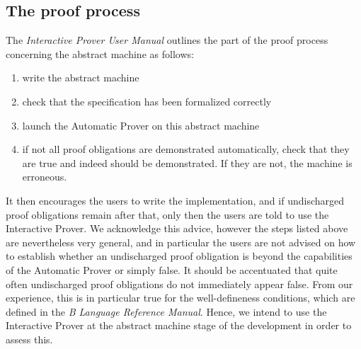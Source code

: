 \documentclass[11pt,journal]{IEEEtran}
\begin{document}
	\subsection{The proof process}
	The \emph{Interactive Prover User Manual}\cite{Prover guide} outlines the part of the proof process concerning the abstract machine as follows:
	\begin{enumerate}
		\item write the abstract machine
		\item check that the specification has been formalized correctly
		\item launch the Automatic Prover on this abstract machine
		\item if not all proof obligations are demonstrated automatically, check that they are true and indeed should be demonstrated. If they are not, the machine is erroneous.
	\end{enumerate}

	It then encourages the users to write the implementation, and if undischarged proof obligations remain after that, only then the users are told to use the Interactive Prover. We acknowledge this advice, however the steps listed above are nevertheless very general, and in particular the users are not advised on how to establish whether an undischarged proof obligation is beyond the capabilities of the Automatic Prover or simply false. It should be accentuated that quite often undischarged proof obligations do not immediately appear false. From our experience, this is in particular true for the well-defineness conditions, which are defined in the \emph{B Language Reference Manual}\cite{b reference}. Hence, we intend to use the Interactive Prover at the abstract machine stage of the development in order to assess this.
	
\end{document}
